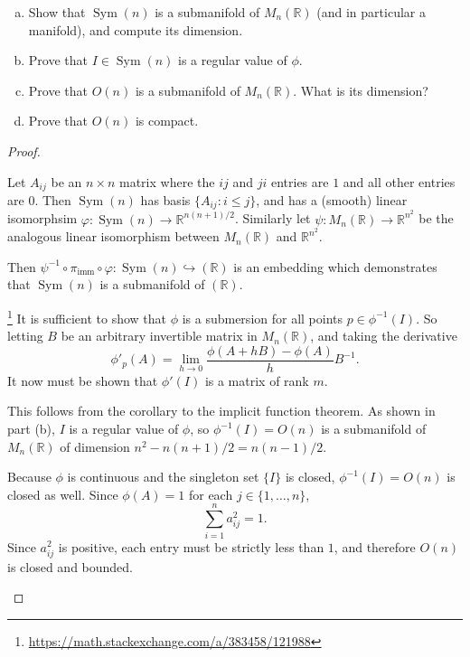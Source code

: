 \documentclass{article}
\newenvironment{problem}[2][Problem]{\begin{trivlist}
\item[\hskip \labelsep {\bfseries #1}\hskip \labelsep {\bfseries #2.}]}{\end{trivlist}}
\newenvironment{problempart}[1]{\begin{trivlist}\item[\textbf{Part #1.}]}{\end{trivlist}}
\begin{document}
\pagebreak

\begin{problem}{6} $ $
  \begin{enumerate}[(a)]
    \item Show that $\operatorname{Sym}(n)$ is a submanifold of
    $M_n(\mathbb{R})$ (and in particular a manifold), and compute its dimension.
    \item Prove that $I \in \operatorname{Sym}(n)$ is a regular value of $\phi$.
    \item Prove that $O(n)$ is a submanifold of $M_n(\mathbb{R})$. What is its dimension?
    \item Prove that $O(n)$ is compact.
  \end{enumerate}
\end{problem}

\begin{proof} \text{\\}
  \begin{problempart}{(a)}
    Let $A_{ij}$ be an $n\times n$ matrix where the $ij$ and $ji$ entries are $1$
    and all other entries are $0$. Then $\operatorname{Sym}(n)$ has basis
    $\{A_{ij} : i \leq j\}$, and has a (smooth) linear isomorphsim
    $\varphi:\operatorname{Sym}(n) \rightarrow \mathbb{R}^{n(n+1)/2}$. Similarly
    let $\psi: M_n(\mathbb{R}) \rightarrow \mathbb{R}^{n^2}$ be the analogous
    linear isomorphism between $ M_n(\mathbb{R})$ and $\mathbb{R}^{n^2}$.

    Then $\psi^{-1} \circ \pi_\text{imm} \circ \varphi: \operatorname{Sym}(n) \hookrightarrow (\mathbb{R})$
    is an embedding which demonstrates that $\operatorname{Sym}(n)$ is a submanifold of $(\mathbb{R})$.
  \end{problempart}
  \begin{problempart}{(b)}\footnote{\url{https://math.stackexchange.com/a/383458/121988}}
    It is sufficient to show that $\phi$ is a submersion for all points
    $p\in\phi^{-1}(I)$. So letting $B$ be an arbitrary invertible matrix in
    $M_n(\mathbb{R})$, and taking the derivative \[
      \phi'_p(A) = \lim_{h \rightarrow 0} \frac{\phi(A + hB) - \phi(A)}{h}B^{-1}.
    \]
    It now must be shown that $\phi'(I)$ is a matrix of rank $m$.
  \end{problempart}
  \begin{problempart}{(c)}
    This follows from the corollary to the implicit function theorem. As shown in
    part (b), $I$ is a regular value of $\phi$, so $\phi^{-1}(I) = O(n)$ is a
    submanifold of $M_n(\mathbb{R})$ of dimension $n^2 - n(n+1)/2 = n(n-1)/2$.
  \end{problempart}
  \begin{problempart}{(d)}
    Because $\phi$ is continuous and the singleton set $\{ I \}$ is closed,
    $\phi^{-1}(I) = O(n)$ is closed as well.
    Since $\phi(A) = 1$ for each $j \in \{ 1,\hdots,n\}$, \[
      \sum_{i=1}^{n} a_{ij}^2 = 1.
    \]
    Since $a_{ij}^2$ is positive, each entry must be strictly less than $1$, and
    therefore $O(n)$ is closed and bounded.
  \end{problempart}
\end{proof}
\end{document}
